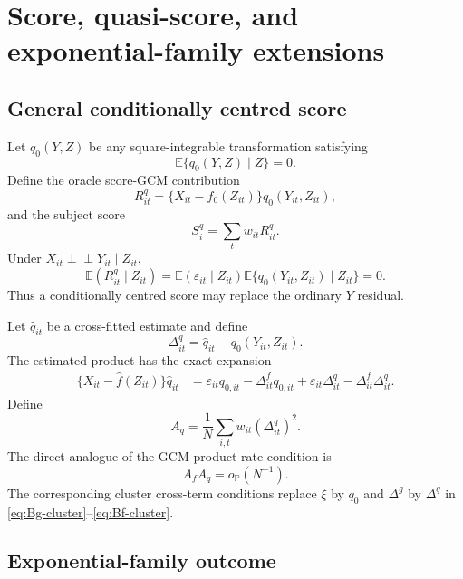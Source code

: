 \documentclass[11pt]{article}
\theoremstyle{definition}
\newcommand{\indep}{\perp\!\!\!\perp}
\newcommand{\E}{\mathbb{E}}
\newcommand{\op}{o_{\mathbb{P}}}
\begin{document}
\section{Score, quasi-score, and exponential-family extensions}

\subsection{General conditionally centred score}

Let $q_0(Y,Z)$ be any square-integrable transformation satisfying
\begin{equation}
\E\{q_0(Y,Z)\mid Z\}=0.
\label{eq:q-centering}
\end{equation}
Define the oracle score-GCM contribution
\[
R^q_{it}=\{X_{it}-f_0(Z_{it})\}q_0(Y_{it},Z_{it}),
\]
and the subject score
\[
S_i^q=\sum_tw_{it}R^q_{it}.
\]
Under $X_{it}\indep Y_{it}\mid Z_{it}$,
\[
\E(R^q_{it}\mid Z_{it})
=\E(\varepsilon_{it}\mid Z_{it})
\E\{q_0(Y_{it},Z_{it})\mid Z_{it}\}=0.
\]
Thus a conditionally centred score may replace the ordinary $Y$ residual.

Let $\widehat q_{it}$ be a cross-fitted estimate and define
\[
\Delta^q_{it}=\widehat q_{it}-q_0(Y_{it},Z_{it}).
\]
The estimated product has the exact expansion
\begin{align}
\{X_{it}-\widehat f(Z_{it})\}\widehat q_{it}
&=
\varepsilon_{it}q_{0,it}
-\Delta^f_{it}q_{0,it}
+\varepsilon_{it}\Delta^q_{it}
-\Delta^f_{it}\Delta^q_{it}.
\label{eq:q-decomp}
\end{align}
Define
\[
A_q=\frac1N\sum_{i,t}w_{it}(\Delta^q_{it})^2.
\]
The direct analogue of the GCM product-rate condition is
\begin{equation}
A_fA_q=\op(N^{-1}).
\label{eq:q-product-rate}
\end{equation}
The corresponding cluster cross-term conditions replace $\xi$ by $q_0$ and
$\Delta^g$ by $\Delta^q$ in \eqref{eq:Bg-cluster}--\eqref{eq:Bf-cluster}.

\subsection{Exponential-family outcome}
\end{document}
